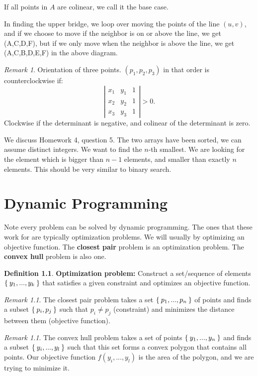 \documentclass[reqno]{amsbook}
\theoremstyle{plain}
\numberwithin{section}{chapter}
\numberwithin{equation}{chapter}
\theoremstyle{definition}
\newtheorem{Def}[theorem]{Definition}
\theoremstyle{remark}
\newtheorem{rem}[theorem]{Remark}
\begin{document}
If all points in $A$ are colinear, we call it the base case. 

In finding the upper bridge, we loop over moving the points of the line $(u,v)$, and if we choose to move if the neighbor is on or above the line, we get (A,C,D,F), but if we only move when the neighbor is above the line, we get (A,C,B,D,E,F) in the above diagram. 


\begin{rem}
Orientation of three points. $(p_1,p_2,p_3)$ in that order is counterclockwise if:
$$
\left|
\begin{matrix}
x_1 & y_1 & 1\\
x_2 & y_2 & 1\\
x_3 & y_3 & 1
\end{matrix}
\right| > 0.
$$
Clockwise if the determinant is negative, and colinear of the determinant is zero. 
\end{rem}

We discuss Homework 4, question 5. The two arrays have been sorted, we can assume distinct integers. We want to find the $n$-th smallest. We are looking for the element which is bigger than $n-1$ elements, and smaller than exactly $n$ elements. This should be very similar to binary search. 


\chapter{Dynamic Programming}

Note every problem can be solved by dynamic programming. The ones that these work for are typically optimization problems. We will usually by optimizing an objective function. The \textbf{closest pair} problem is an optimization problem. The \textbf{convex hull} problem is also one. 

\begin{Def}
\textbf{Optimization problem: } Construct a set/sequence of elements $\Set{y_1,...,y_k}$ that satisfies a given constraint and optimizes an objective function. 
\end{Def}

\begin{rem}
The closest pair problem takes a set $\Set{p_1,...,p_n}$ of points and finds a subset $\Set{p_i,p_j}$ such that $p_i \neq p_j$ (constraint) and minimizes the distance between them (objective function). 
\end{rem}

\begin{rem}
The convex hull problem takes a set of points $\Set{y_1,...,y_n}$ and finds a subset $\Set{y_i,...,y_l}$ such that this set forms a convex polygon that contains all points. Our objective function $f(y_i,...,y_l)$ is the area of the polygon, and we are trying to minimize it. 
\end{rem}
\end{document}
